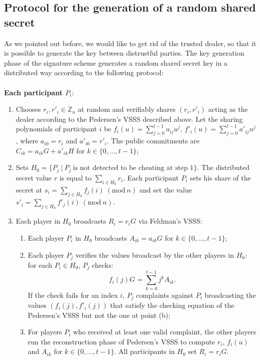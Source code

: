 \bigskip

\subsection{Protocol for the generation of a random shared secret}
\label{subsec:2}
As we pointed out before, we would like to get rid of the trusted dealer, so that it is possible to generate the key between distrustful parties. The key generation phase of the signature scheme generates a random shared secret key in a distributed way according to the following protocol:
\\
\\
{\bf Each participant $P_i$}:
\begin{enumerate}
	\item Chooses $r_i, r'_i \in \mathbb{Z}_n$ at random and verifiably shares $(r_i, r'_i)$ acting as the dealer according to the Pedersen's VSSS described above. Let the sharing polynomials of participant $i$ be $f_i(u) = \sum_{j = 0}^{t - 1}a_{ij}u^j$, $f'_i(u) = \sum_{j= 0}^{t - 1}a'_{ij}u^j$, where $a_{i0} = r_i$ and $a'_{i0} = r'_i$. The public commitments are $C_{ik} = a_{ik}G + a'_{ik}H$ for $k \in \{0, ..., t - 1\}$;
	\item Sets $H_0 = \{P_j \ | \ P_j \ \text{is not detected to be cheating at step 1}\}$. The distributed secret value $r$ is equal to $\sum_{i \in H_0}r_i$. Each participant $P_i$ sets his share of the secret at $s_i= \sum_{j \in H_0}f_j(i) \ (\text{mod} \ n)$ and set the value $s'_i = \sum_{j \in H_0}f'_j(i) \ (\text{mod} \ n)$.
	\item Each player in $H_0$ broadcasts $R_i = r_iG$ via Feldman's VSSS:
	\begin{enumerate}
		\item Each player $P_i$ in $H_0$ broadcasts $A_{ik} = a_{ik}G$ for $k \in \{0, ..., t - 1\}$;
		\item Each player $P_j$ verifies the values broadcast by the other players in $H_0$: for each $P_i \in H_0$, $P_j$ checks:
		$$f_i(j)G = \sum_{k = 0}^{t - 1} j^kA_{ik}.$$
		If the check fails for an index $i$, $P_j$ complaints against $P_i$ broadcasting the values $(f_i(j), f'_i(j))$ that satisfy the checking equation of the Pedersen's VSSS but not the one at point (b);
		\item For players $P_i$ who received at least one valid complaint, the other players run the reconstruction phase of Pedersen's VSSS to compute $r_i$, $f_i(u)$ and $A_{ik}$ for $k \in \{0, ..., t - 1\}$. All participants in $H_0$ set $R_i = r_iG$. 
	\end{enumerate} 
\end{enumerate}
